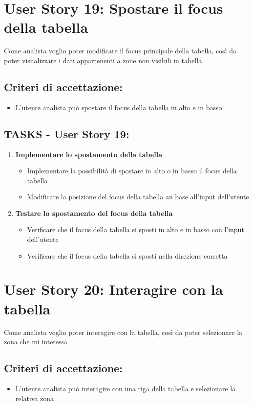 \section*{User Story 19: Spostare il focus della tabella}
    Come analista voglio poter modificare il focus principale della tabella, così da poter visualizzare i dati appartenenti a zone non visibili in tabella
    \subsection*{Criteri di accettazione:}  
    \begin{itemize}  
        \item L'utente analista può spostare il focus della tabella in alto e in basso
    \end{itemize}  
    \subsection*{TASKS - User Story 19:}  
    \begin{enumerate}  
        \item \textbf{Implementare lo spostamento della tabella}  
            \begin{itemize}  
                \item Implementare la possibilità di spostare in alto o in basso il focus della tabella
                \item Modificare la posizione del focus della tabella an base all'input dell'utente
            \end{itemize} 
        \item \textbf{Testare lo spostamento del focus della tabella}  
            \begin{itemize}  
                \item Verificare che il focus della tabella si sposti in alto e in basso con l'input dell'utente
                \item Verificare che il focus della tabella si sposti nella direzione corretta
            \end{itemize} 
    \end{enumerate}
\section*{User Story 20: Interagire con la tabella}
    Come analista voglio poter interagire con la tabella, così da poter selezionare la zona che mi interessa
    \subsection*{Criteri di accettazione:}  
    \begin{itemize}  
        \item L'utente analista può interagire con una riga della tabella e selezionare la relativa zona
    \end{itemize}  
